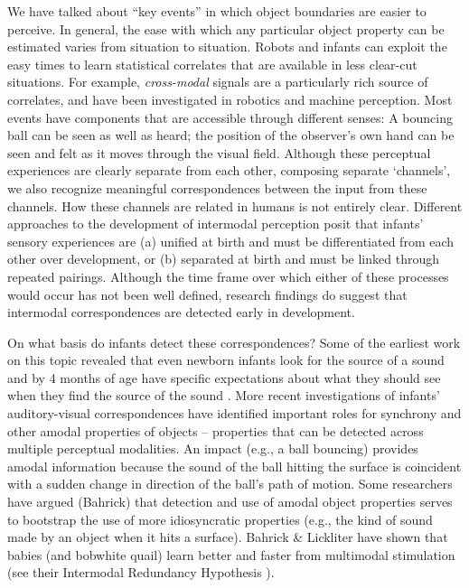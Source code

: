 
We have talked about ``key events'' in which object boundaries are
easier to perceive.  In general, the ease with which any particular
object property can be estimated varies from situation to situation.
Robots and infants can exploit the easy times to learn statistical
correlates that are available in less clear-cut situations.  For
example, {\em cross-modal} signals are a particularly rich source of
correlates, and have been investigated in robotics and machine
perception.
%
%
%
Most events have components that are accessible through different
senses: A bouncing ball can be seen as well as heard; the position of
the observer's own hand can be seen and felt as it moves through the
visual field.  Although these perceptual experiences are clearly
separate from each other, composing separate `channels', we also
recognize meaningful correspondences between the input from these
channels.
%
%
How these channels are related
%
in humans 
%
is not entirely clear.  Different
approaches to the development of intermodal perception posit that
infants' sensory experiences are (a) unified at birth and must be
differentiated from each other over development, or (b) separated at
birth and must be linked through repeated pairings. Although the time
frame over which either of these processes would occur has not been
well defined, research findings do suggest that intermodal
correspondences are detected early in development.

On what basis do infants detect these correspondences?  Some of the
earliest work on this topic revealed that even newborn infants look
for the source of a sound \cite{butterworth76coordination} and by 4
months of age have specific expectations about what they should see
when they find the source of the sound \cite{spelke76infants}.  More recent
investigations of infants' auditory-visual correspondences have
identified important roles for synchrony and other amodal properties
of objects -- properties that can be detected across multiple
perceptual modalities.  An impact (e.g., a ball bouncing) provides
amodal information because the sound of the ball hitting the surface
is coincident with a sudden change in direction of the ball's path of
motion.  Some researchers have argued (Bahrick) that detection
and use of amodal object properties serves to bootstrap the use of
more idiosyncratic properties (e.g., the kind of sound made by an
object when it hits a surface).
%
%
Bahrick \& Lickliter
have shown that babies (and bobwhite quail) learn better and
faster from multimodal stimulation (see their
Intermodal Redundancy Hypothesis \cite{bahrick00intersensory}).

